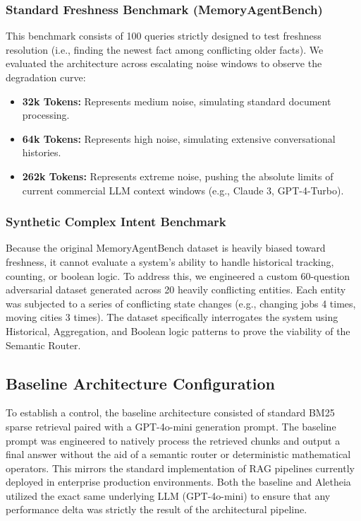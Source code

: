 \documentclass[journal,10pt]{IEEEtran}
\begin{document}
\subsubsection{Standard Freshness Benchmark (MemoryAgentBench)}
This benchmark consists of 100 queries strictly designed to test freshness resolution (i.e., finding the newest fact among conflicting older facts). We evaluated the architecture across escalating noise windows to observe the degradation curve:
\begin{itemize}
    \item \textbf{32k Tokens:} Represents medium noise, simulating standard document processing.
    \item \textbf{64k Tokens:} Represents high noise, simulating extensive conversational histories.
    \item \textbf{262k Tokens:} Represents extreme noise, pushing the absolute limits of current commercial LLM context windows (e.g., Claude 3, GPT-4-Turbo).
\end{itemize}

\subsubsection{Synthetic Complex Intent Benchmark}
Because the original MemoryAgentBench dataset is heavily biased toward freshness, it cannot evaluate a system's ability to handle historical tracking, counting, or boolean logic. To address this, we engineered a custom 60-question adversarial dataset generated across 20 heavily conflicting entities. Each entity was subjected to a series of conflicting state changes (e.g., changing jobs 4 times, moving cities 3 times). The dataset specifically interrogates the system using Historical, Aggregation, and Boolean logic patterns to prove the viability of the Semantic Router.

\subsection{Baseline Architecture Configuration}
To establish a control, the baseline architecture consisted of standard BM25 sparse retrieval paired with a GPT-4o-mini generation prompt. The baseline prompt was engineered to natively process the retrieved chunks and output a final answer without the aid of a semantic router or deterministic mathematical operators. This mirrors the standard implementation of RAG pipelines currently deployed in enterprise production environments. Both the baseline and Aletheia utilized the exact same underlying LLM (GPT-4o-mini) to ensure that any performance delta was strictly the result of the architectural pipeline.
\end{document}
